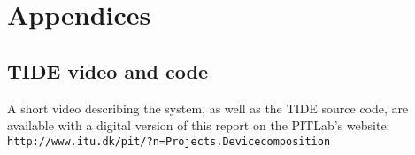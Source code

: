 \part*{Appendices}

\appendix
\chapter{TIDE video and code}
\label{video}

A short video describing the system, as well as the TIDE source code, are available with a digital version of this report on the PITLab's website:\\
\linebreak
\texttt{http://www.itu.dk/pit/?n=Projects.Devicecomposition}


